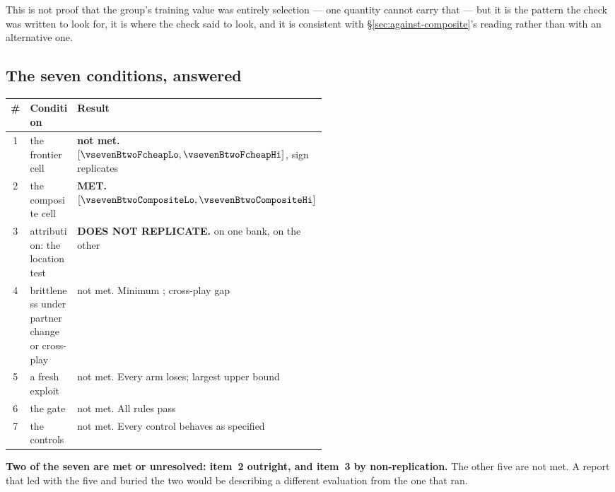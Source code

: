 This is not proof that the group's training value was entirely selection --- one quantity cannot carry
that --- but it is the pattern the check was written to look for, it is where the check said to look,
and it is consistent with \S\ref{sec:against-composite}'s reading rather than with an alternative one.

\subsection{The seven conditions, answered}
\label{sec:against-seven}

\begin{center}\small
\begin{tabular}{clp{0.52\linewidth}}
\toprule
\# & Condition & Result \\
\midrule
1 & the frontier cell & \textbf{not met.} \vsevenBtwoFcheap{} $[\vsevenBtwoFcheapLo, \vsevenBtwoFcheapHi]$, sign replicates \\
2 & the composite cell & \textbf{MET.} \vsevenBtwoComposite{} $[\vsevenBtwoCompositeLo, \vsevenBtwoCompositeHi]$ \\
3 & attribution: the location test & \textbf{DOES NOT REPLICATE.} \vsevenLocVerdictOne{} on one bank, \vsevenLocVerdictThree{} on the other \\
4 & brittleness under partner change or cross-play & not met. Minimum \vsevenSoneMin{}; cross-play gap \vsevenXpGap{} \\
5 & a fresh exploit & not met. Every arm loses; largest upper bound \vsevenBfourWorstUpper{} \\
6 & the gate & not met. All \vsevenGateRules{} rules pass \\
7 & the controls & not met. Every control behaves as specified \\
\bottomrule
\end{tabular}
\end{center}

\textbf{Two of the seven are met or unresolved: item~2 outright, and item~3 by non-replication.} The
other five are not met. A report that led with the five and buried the two would be describing a
different evaluation from the one that ran.
